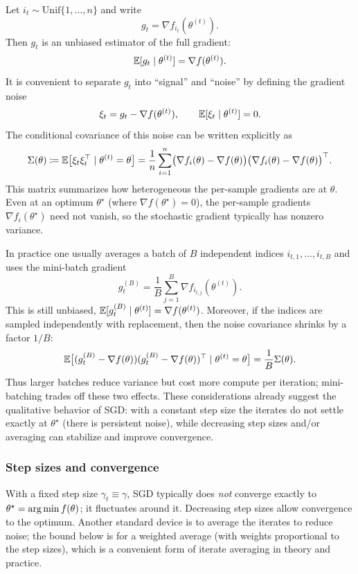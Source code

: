 Let $i_t\sim \mathrm{Unif}\{1,\dots,n\}$ and write
\[
g_t = \nabla f_{i_t}(\theta^{(t)}).
\]
Then $g_t$ is an unbiased estimator of the full gradient:
\[
\mathbb{E}[g_t \mid \theta^{(t)}] = \nabla f(\theta^{(t)}).
\]
It is convenient to separate $g_t$ into ``signal'' and ``noise'' by defining the gradient noise
\[
  \xi_t = g_t - \nabla f(\theta^{(t)}),
  \qquad \mathbb{E}[\xi_t \mid \theta^{(t)}]=0.
\]
The conditional covariance of this noise can be written explicitly as
\begin{equation}
  \Sigma(\theta)
  \coloneqq
  \mathbb{E}\bigl[\xi_t\xi_t^\top \mid \theta^{(t)}=\theta\bigr]
  =
  \frac{1}{n}\sum_{i=1}^n \bigl(\nabla f_i(\theta)-\nabla f(\theta)\bigr)\bigl(\nabla f_i(\theta)-\nabla f(\theta)\bigr)^\top.
  \label{eq:sgd-noise-cov}
\end{equation}
This matrix summarizes how heterogeneous the per-sample gradients are at $\theta$.
Even at an optimum $\theta^\star$ (where $\nabla f(\theta^\star)=0$), the per-sample gradients $\nabla f_i(\theta^\star)$ need not vanish, so the stochastic gradient typically has nonzero variance.

In practice one usually averages a batch of $B$ independent indices $i_{t,1},\dots,i_{t,B}$ and uses the mini-batch gradient
\[
g_t^{(B)} = \frac{1}{B}\sum_{j=1}^B \nabla f_{i_{t,j}}(\theta^{(t)}).
\]
This is still unbiased, $\mathbb{E}[g_t^{(B)}\mid \theta^{(t)}]=\nabla f(\theta^{(t)})$.
Moreover, if the indices are sampled independently with replacement, then the noise covariance shrinks by a factor $1/B$:
\begin{equation}
  \mathbb{E}\bigl[(g_t^{(B)}-\nabla f(\theta))(g_t^{(B)}-\nabla f(\theta))^\top \mid \theta^{(t)}=\theta\bigr]
  = \frac{1}{B}\Sigma(\theta).
  \label{eq:minibatch-cov}
\end{equation}
Thus larger batches reduce variance but cost more compute per iteration; mini-batching trades off these two effects.
These considerations already suggest the qualitative behavior of SGD:
with a constant step size the iterates do not settle exactly at $\theta^\star$ (there is persistent noise), while decreasing step sizes and/or averaging can stabilize and improve convergence.

\subsubsection{Step sizes and convergence}
\label{subsec:sgd-stepsizes}

With a fixed step size $\gamma_t\equiv \gamma$, SGD typically does \emph{not} converge exactly to $\theta^\star=\operatorname*{arg\,min} f(\theta)$; it fluctuates around it.
Decreasing step sizes allow convergence to the optimum.
Another standard device is to average the iterates to reduce noise; the bound below is for a weighted average (with weights proportional to the step sizes), which is a convenient form of iterate averaging in theory and practice.

